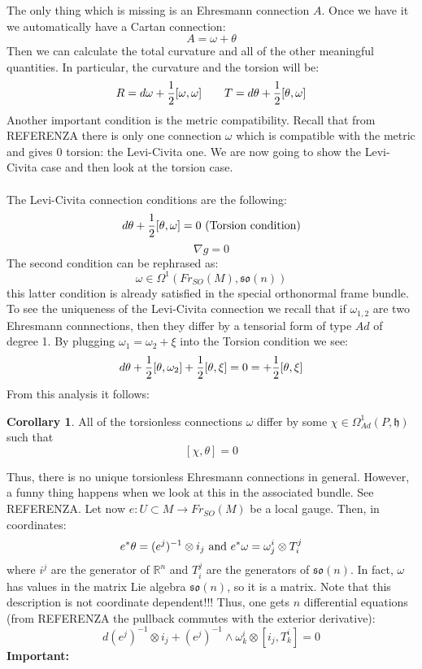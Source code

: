 \documentclass[12pt,a4paper]{report}
\theoremstyle{definition}
\theoremstyle{Theorem}
\theoremstyle{definition}
\theoremstyle{definition}
\newtheorem{Cor}[Def]{Corollary}
\begin{document}
		The only thing which is missing is an Ehresmann connection $A$. Once we have it we automatically have a Cartan connection:
		$$A=\omega+\theta$$
		Then we can calculate the total curvature and all of the other meaningful quantities. In particular, the curvature and the torsion will be:
		$$R=d\omega+{1\over 2}[\omega,\omega]\hspace{ 20 pt} T=d\theta+{1\over 2}[\theta,\omega]$$
		Another important condition is the metric compatibility. Recall that from REFERENZA there is only one connection $\omega$ which is compatible with the metric and gives $0$ torsion: the Levi-Civita one. We are now going to show the Levi-Civita case and then look at the torsion case.\\
		\\
		The Levi-Civita connection conditions are the following:
		$$d\theta+{1\over 2}[\theta,\omega]=0 \hbox{ (Torsion condition)}$$
		$$\nabla g=0$$
		The second condition can be rephrased as:
		$$\omega\in\Omega^1(Fr_{SO}(M),\mathfrak{so}(n))$$
		this latter condition is already satisfied in the special orthonormal frame bundle.\\
		To see the uniqueness of the Levi-Civita connection we recall that if $\omega_{1,2}$ are two Ehresmann connnections, then they differ by a tensorial form of type $Ad$ of degree 1. By plugging $\omega_1=\omega_2+\xi$ into the Torsion condition we see:
		$$d\theta+{1\over 2}[\theta,\omega_2]+{1\over 2}[\theta,\xi]=0=+{1\over 2}[\theta,\xi]$$
		From this analysis it follows:
		\begin{Cor}
			All of the torsionless connections $\omega$ differ by some $\chi\in\Omega^1_{Ad}(P,\mathfrak{h})$ such that
			$$[\chi,\theta]=0$$
		\end{Cor}
		Thus, there is no unique torsionless Ehresmann connections in general. However, a funny thing happens when we look at this in the associated bundle. See REFERENZA.
		Let now $e:U\subset M\rightarrow Fr_{SO}(M)$ be a local gauge. Then, in coordinates:
		$$e^*\theta=(e^j)^{-1}\otimes i_j\hbox{ and }e^*\omega=\omega^i_j\otimes T^j_i$$
		where $i^j$ are the generator of $\mathbb{R}^n$ and $T^j_i$ are the generators of $\mathfrak{so}(n)$.
		In fact, $\omega$ has values in the matrix Lie algebra $\mathfrak{so}(n)$, so it is a matrix. Note that this description is not coordinate dependent!!! Thus, one gets $n$ differential equations (from REFERENZA the pullback commutes with the exterior derivative):
		$$d(e^j)^{-1}\otimes i_j+(e^j)^{-1}\wedge \omega^i_k \otimes [i_j,T^i_k]=0$$
		\textbf{Important:}
		\\
\end{document}
